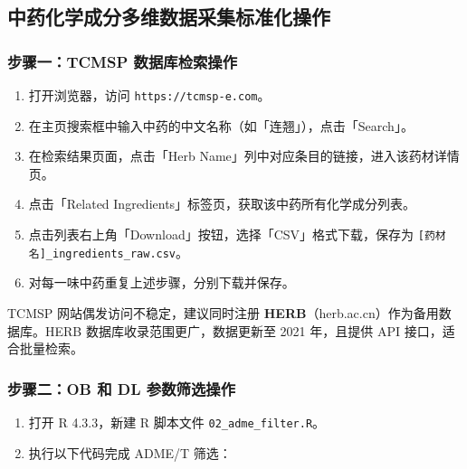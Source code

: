\documentclass[12pt,a4paper,twoside]{article}
\newcommand{\database}[1]{\textbf{\textsf{#1}}}
\begin{document}
\subsection{中药化学成分多维数据采集标准化操作}
\label{sec:module2_data_collection}

\subsubsection{步骤一：TCMSP 数据库检索操作}

\begin{enumerate}
  \item 打开浏览器，访问 \texttt{https://tcmsp-e.com}。
  \item 在主页搜索框中输入中药的中文名称（如「连翘」），点击「Search」。
  \item 在检索结果页面，点击「Herb Name」列中对应条目的链接，进入该药材详情页。
  \item 点击「Related Ingredients」标签页，获取该中药所有化学成分列表。
  \item 点击列表右上角「Download」按钮，选择「CSV」格式下载，保存为 \texttt{[药材名]\_ingredients\_raw.csv}。
  \item 对每一味中药重复上述步骤，分别下载并保存。
\end{enumerate}

\begin{warningbox}
TCMSP 网站偶发访问不稳定，建议同时注册 \database{HERB}（herb.ac.cn）作为备用数据库。HERB 数据库收录范围更广，数据更新至 2021 年，且提供 API 接口，适合批量检索。
\end{warningbox}

\subsubsection{步骤二：OB 和 DL 参数筛选操作}

\begin{enumerate}
  \item 打开 R 4.3.3，新建 R 脚本文件 \texttt{02\_adme\_filter.R}。
  \item 执行以下代码完成 ADME/T 筛选：
\end{enumerate}
\end{document}
